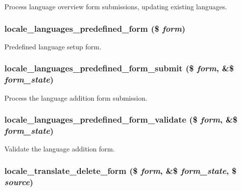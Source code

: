 \label{group__locale_ga957be3bb6cd02af2ff2acd887fc2b3fe}
Process language overview form submissions, updating existing languages. \hypertarget{group__locale_ga06a3fbf820480d99d755aee5ae6a74dc}{
\subsubsection[{locale\_\-languages\_\-predefined\_\-form}]{\setlength{\rightskip}{0pt plus 5cm}locale\_\-languages\_\-predefined\_\-form (\$ {\em form})}}
\label{group__locale_ga06a3fbf820480d99d755aee5ae6a74dc}
Predefined language setup form. \hypertarget{group__locale_ga83df19c32a63b094d033d0802d74d7cd}{
\subsubsection[{locale\_\-languages\_\-predefined\_\-form\_\-submit}]{\setlength{\rightskip}{0pt plus 5cm}locale\_\-languages\_\-predefined\_\-form\_\-submit (\$ {\em form}, \/  \&\$ {\em form\_\-state})}}
\label{group__locale_ga83df19c32a63b094d033d0802d74d7cd}
Process the language addition form submission. \hypertarget{group__locale_ga4298724abc57b7d2622a2c9642b4f742}{
\subsubsection[{locale\_\-languages\_\-predefined\_\-form\_\-validate}]{\setlength{\rightskip}{0pt plus 5cm}locale\_\-languages\_\-predefined\_\-form\_\-validate (\$ {\em form}, \/  \&\$ {\em form\_\-state})}}
\label{group__locale_ga4298724abc57b7d2622a2c9642b4f742}
Validate the language addition form. \hypertarget{group__locale_gaf40a5c539ee94ae8b089275bf74e1bfe}{
\subsubsection[{locale\_\-translate\_\-delete\_\-form}]{\setlength{\rightskip}{0pt plus 5cm}locale\_\-translate\_\-delete\_\-form (\$ {\em form}, \/  \&\$ {\em form\_\-state}, \/  \$ {\em source})}}
